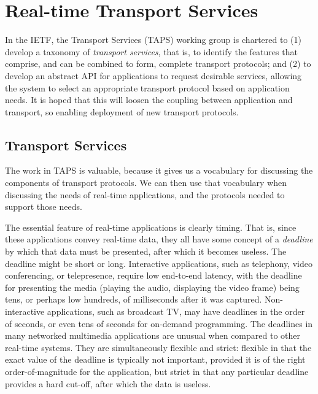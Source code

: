 \documentclass[10pt]{sig-alternate-05-2015}
\begin{document}
\section{Real-time Transport Services}
\label{sec:services}

In the IETF, the Transport Services (TAPS) working group is chartered to
(1) develop a taxonomy of \emph{transport services}, that is, to identify the
features that comprise, and can be combined to form, complete transport
protocols; and (2) to develop an abstract API for applications to request
desirable services, allowing the system to select an appropriate transport
protocol based on application needs. It is hoped that this will loosen the
coupling between application and transport, so enabling deployment of new
transport protocols.

\subsection{Transport Services}

The work in TAPS is valuable, because it gives us a vocabulary for
discussing the components of transport protocols.  We can then use that
vocabulary when discussing the needs of real-time applications, and the
protocols needed to support those needs.

The essential feature of real-time applications is clearly timing. That is,
since these applications convey real-time data, they all have some concept
of a \emph{deadline} by which that data must be presented, after which it
becomes useless.
The deadline might be short or long. Interactive applications, such as
telephony, video conferencing, or telepresence, require low end-to-end
latency, with the deadline for presenting the media (playing the audio,
displaying the video frame) being tens, or perhaps low hundreds, of
milliseconds after it was captured. Non-interactive applications, such as
broadcast TV, may have deadlines in the order of seconds, or even tens of
seconds for on-demand programming.
The deadlines in many networked multimedia applications are unusual when
compared to other real-time systems. They are simultaneously flexible and
strict: flexible in that the exact value of the deadline is typically not
important, provided it is of the right order-of-magnitude for the
application, but strict in that any particular deadline provides a hard
cut-off, after which the data is useless.
\end{document}
